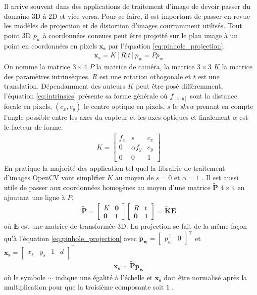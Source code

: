 Il arrive souvent dans des applications de traitement d'image de devoir passer du domaine 3D à 2D et vice-versa. Pour ce faire, il est important de passer en revue les modèles de projection et de distortion d'images courramment utilisés. Tout point 3D $p_w$ à coordonnées connues peut être projetté sur le plan image à un point en coordonnées en pixels $\boldsymbol{x_s}$ par l'équation \ref{eq:pinhole_projection}.
\begin{align}
\boldsymbol{x_s} = K[R|t]p_w = P p_w
\label{eq:pinhole_projection}
\end{align}
On nomme la matrice $3\times4$ $P$ la matrice de caméra, la matrice $3\times3$ $K$ la matrice des paramètres intrinsèques, $R$ est une rotation othogonale et $t$ est une translation. Dépendamment des auteurs $K$ peut être posé différemment, l'équation \ref{eq:intrinsics} présente sa forme générale où $f_{[x,y]}$ sont la distance focale en pixels, $(c_x, c_y)$ le centre optique en pixels, $s$ le \textit{skew} prenant en compte l'angle possible entre les axes du capteur et les axes optiques et finalement $\alpha$ est le facteur de forme.
\begin{align}
  K = \begin{bmatrix}
  f_x & s & c_x \\
  0   & \alpha f_y & c_y \\
  0  &  0  & 1
\end{bmatrix}
\label{eq:intrinsics}
\end{align}
En pratique la majorité des application tel quel la librairie de traitement d'images OpenCV vont simplifier $K$ au moyen de $s = 0$ et $\alpha = 1$ \citep{itseez2015}. Il est aussi utile de passer aux coordonnées homogènes au moyen d'une matrice $\boldsymbol{\tilde{P}}$ $4\times4$ en ajoutant une ligne à $P$,
\begin{align}
  \boldsymbol{\tilde{P}} = \begin{bmatrix}K & \boldsymbol{0} \\ \boldsymbol{0} & 1\end{bmatrix}
  \begin{bmatrix}R & t \\ \boldsymbol{0} & 1\end{bmatrix} = \boldsymbol{\tilde{K}} \boldsymbol{E}
    \label{eq:homogeneous_projection}
\end{align}
où $\boldsymbol{E}$ est une matrice de transformée 3D. La projection se fait de la même façon qu'à l'équation \ref{eq:pinhole_projection} avec $\boldsymbol{\bar{p}_w} = \begin{bmatrix}p_w^\top & 0 \end{bmatrix}^\top$ et $\boldsymbol{x_s} = \begin{bmatrix}x_s & y_s & 1 & d\end{bmatrix}^\top$
\begin{align}
  \boldsymbol{x_s} \sim \boldsymbol{\tilde{P}} \boldsymbol{\bar{p}_w}
\end{align}
où le symbole $\sim$ indique une égalité à l'échelle et $\boldsymbol{x_s}$ doit être normalisé après la multiplication pour que la troisième composante soit $1$ \citep{Szeliski2011}.

